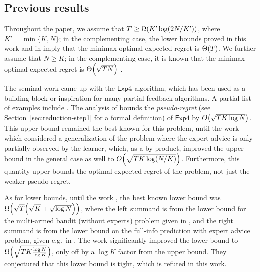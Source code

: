 \documentclass[a4paper,11pt]{article}
\theoremstyle{definition}
\newcommand{\EXP}{\mathsf{Exp}}
\begin{document}
\subsection{Previous results}
Throughout the paper, we assume that $T \geq \Omega \mleft(K' \log (2N/K') \mright)$, where $K' = \min\{K,N\}$; in the complementing case, the lower bounds proved in this work and in \cite{auer2002nonstochastic} imply that the minimax optimal expected regret is $\Theta \mleft( T \mright)$. We further assume that $N \ge K$; in the complementing case, it is known that the minimax optimal expected regret is $\Theta\mleft(\sqrt{T N} \mright)$ \cite{auer2002nonstochastic, kale2014multiarmed}.

The seminal work \cite{auer2002nonstochastic} came up with the $\EXP4$ algorithm, which has been used as a building block or inspiration for many partial feedback algorithms. A partial list of examples include \cite{mcmahan2009tighter, seldin2011pac, daniely2013price, raman2024multiclass}. The analysis of \cite{auer2002nonstochastic} bounds the \emph{pseudo-regret} (see Section~\ref{sec:reduction-step1} for a formal definition) of $\EXP4$ by $O\mleft( \sqrt{T K \log N} \mright)$. This upper bound remained the best known for this problem, until the work \cite{kale2014multiarmed} which considered a generalization of the problem where the expert advice is only partially observed by the learner, which, as a by-product, improved the upper bound in the general case as well to $O\mleft( \sqrt{T K \log (N/K)} \mright)$. Furthermore, this quantity upper bounds the optimal expected regret of the problem, not just the weaker pseudo-regret. 

As for lower bounds, until the work \cite{seldin2016lower}, the best known lower bound was $\Omega\mleft( \sqrt{T} \mleft( \sqrt{K} + \sqrt{\log N} \mright)  \mright)$, where the left summand is from the lower bound for the multi-armed bandit (without experts) problem given in \cite{auer2002nonstochastic}, and the right summand is from the lower bound on the full-info prediction with expert advice problem, given e.g.\ in \cite{cesa2006prediction}. The work \cite{seldin2016lower} significantly improved the lower bound to $ \Omega \mleft(\sqrt{T K \frac{\log N}{\log K}} \mright)$, only off by a $\log K$ factor from the upper bound. They conjectured that this lower bound is tight, which is refuted in this work.
\end{document}
